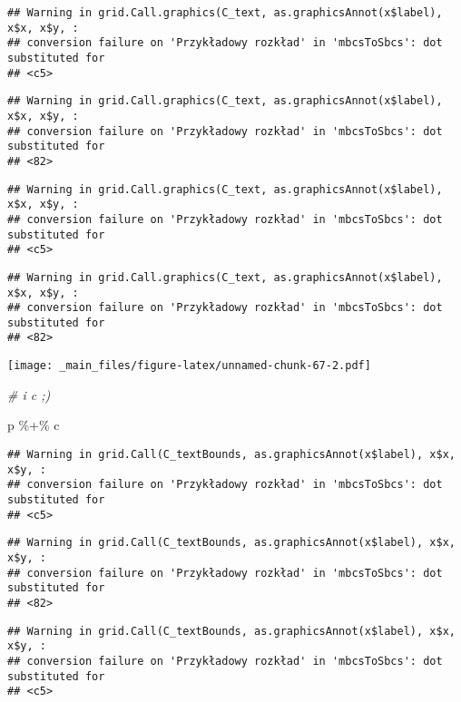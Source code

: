 \documentclass[
]{book}
\newenvironment{Shaded}{\begin{snugshade}}{\end{snugshade}}
\newcommand{\CommentTok}[1]{\textcolor[rgb]{0.56,0.35,0.01}{\textit{#1}}}
\newcommand{\NormalTok}[1]{#1}
\newcommand{\SpecialCharTok}[1]{\textcolor[rgb]{0.00,0.00,0.00}{#1}}
\begin{document}
\begin{verbatim}
## Warning in grid.Call.graphics(C_text, as.graphicsAnnot(x$label), x$x, x$y, :
## conversion failure on 'Przykładowy rozkład' in 'mbcsToSbcs': dot substituted for
## <c5>
\end{verbatim}

\begin{verbatim}
## Warning in grid.Call.graphics(C_text, as.graphicsAnnot(x$label), x$x, x$y, :
## conversion failure on 'Przykładowy rozkład' in 'mbcsToSbcs': dot substituted for
## <82>
\end{verbatim}

\begin{verbatim}
## Warning in grid.Call.graphics(C_text, as.graphicsAnnot(x$label), x$x, x$y, :
## conversion failure on 'Przykładowy rozkład' in 'mbcsToSbcs': dot substituted for
## <c5>
\end{verbatim}

\begin{verbatim}
## Warning in grid.Call.graphics(C_text, as.graphicsAnnot(x$label), x$x, x$y, :
## conversion failure on 'Przykładowy rozkład' in 'mbcsToSbcs': dot substituted for
## <82>
\end{verbatim}

\texttt{[image: \_main\_files/figure-latex/unnamed-chunk-67-2.pdf]}

\begin{Shaded}
\begin{Highlighting}[]
\CommentTok{\# i c ;)}

\NormalTok{p }\SpecialCharTok{\%+\%}\NormalTok{ c}
\end{Highlighting}
\end{Shaded}

\begin{verbatim}
## Warning in grid.Call(C_textBounds, as.graphicsAnnot(x$label), x$x, x$y, :
## conversion failure on 'Przykładowy rozkład' in 'mbcsToSbcs': dot substituted for
## <c5>
\end{verbatim}

\begin{verbatim}
## Warning in grid.Call(C_textBounds, as.graphicsAnnot(x$label), x$x, x$y, :
## conversion failure on 'Przykładowy rozkład' in 'mbcsToSbcs': dot substituted for
## <82>
\end{verbatim}

\begin{verbatim}
## Warning in grid.Call(C_textBounds, as.graphicsAnnot(x$label), x$x, x$y, :
## conversion failure on 'Przykładowy rozkład' in 'mbcsToSbcs': dot substituted for
## <c5>
\end{verbatim}
\end{document}
